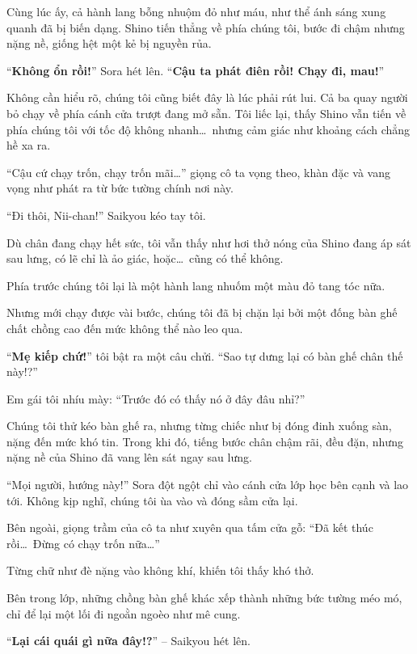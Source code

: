 \documentclass[../main.tex]{subfiles}
\begin{document}
Cùng lúc ấy, cả hành lang bỗng nhuộm đỏ như máu, như thể ánh sáng xung quanh đã bị biến dạng. Shino tiến thẳng về phía chúng tôi, bước đi chậm nhưng nặng nề, giống hệt một kẻ bị nguyền rủa.


``\textbf{Không ổn rồi!}'' Sora hét lên. ``\textbf{Cậu ta phát điên rồi! Chạy đi, mau!}''

Không cần hiểu rõ, chúng tôi cũng biết đây là lúc phải rút lui. Cả ba quay người bỏ chạy về phía cánh cửa trượt đang mở sẵn. Tôi liếc lại, thấy Shino vẫn tiến về phía chúng tôi với tốc độ không nhanh\dots\ nhưng cảm giác như khoảng cách chẳng hề xa ra.

``Cậu cứ chạy trốn, chạy trốn mãi\dots'' giọng cô ta vọng theo, khàn đặc và vang vọng như phát ra từ bức tường chính nơi này.

``Đi thôi, Nii-chan!'' Saikyou kéo tay tôi.

Dù chân đang chạy hết sức, tôi vẫn thấy như hơi thở nóng của Shino đang áp sát sau lưng, có lẽ chỉ là ảo giác, hoặc\dots\ cũng có thể không.

Phía trước chúng tôi lại là một hành lang nhuốm một màu đỏ tang tóc nữa.

Nhưng mới chạy được vài bước, chúng tôi đã bị chặn lại bởi một đống bàn ghế chất chồng cao đến mức không thể nào leo qua.


``\textbf{Mẹ kiếp chứ!}'' tôi bật ra một câu chửi. ``Sao tự dưng lại có bàn ghế chân thế này!?''

Em gái tôi nhíu mày: ``Trước đó có thấy nó ở đây đâu nhỉ?''

Chúng tôi thử kéo bàn ghế ra, nhưng từng chiếc như bị đóng đinh xuống sàn, nặng đến mức khó tin. Trong khi đó, tiếng bước chân chậm rãi, đều đặn, nhưng nặng nề của Shino đã vang lên sát ngay sau lưng.

``Mọi người, hướng này!'' Sora đột ngột chỉ vào cánh cửa lớp học bên cạnh và lao tới. Không kịp nghĩ, chúng tôi ùa vào và đóng sầm cửa lại.

Bên ngoài, giọng trầm của cô ta như xuyên qua tấm cửa gỗ: ``Đã kết thúc rồi\dots\ Đừng có chạy trốn nữa\dots''

Từng chữ như đè nặng vào không khí, khiến tôi thấy khó thở.

Bên trong lớp, những chồng bàn ghế khác xếp thành những bức tường méo mó, chỉ để lại một lối đi ngoằn ngoèo như mê cung.


``\textbf{Lại cái quái gì nữa đây!?}'' – Saikyou hét lên.
\end{document}

